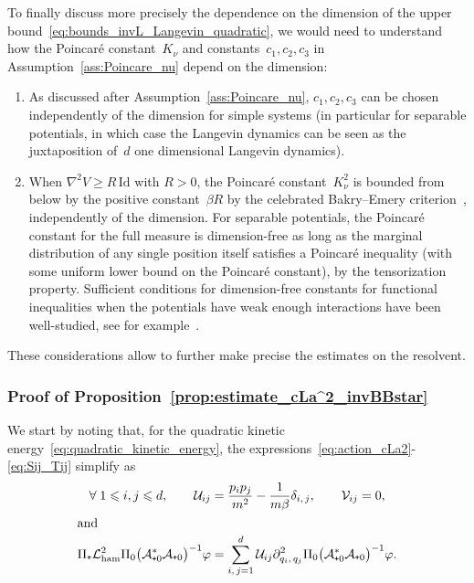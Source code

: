 \documentclass[AHL,Unicode,longabstracts,MathTools,published]{cedram}
\newcommand{\Id}{\mathrm{Id}}
\newcommand{\cLa}{\mathcal{A}}
\newcommand{\cLU}{\mathcal{U}}
\newcommand{\clV}{\mathcal{V}}
\newcommand{\cLham}{\mathcal{L}_{\rm ham}}
\newcommand{\subplus}{\textnormal{\texttt{+}}}
\renewcommand{\leq}{\leqslant}
\renewcommand{\geq}{\geqslant}
\newcommand*{\romanenumi}{\renewcommand*{\theenumi}{\roman{enumi}}}
\let\oldforall\forall
\renewcommand*{\forall}{\mathrel{\oldforall}}
\begin{document}
To finally discuss more precisely the dependence on the dimension of the upper bound~\eqref{eq:bounds_invL_Langevin_quadratic}, we would need to understand how the Poincaré constant~$K_\nu$ and constants~$c_1,c_2,c_3$ in Assumption~\ref{ass:Poincare_nu} depend on the dimension:
\begin{enumerate}\romanenumi
\item As discussed after Assumption~\ref{ass:Poincare_nu}, $c_1,c_2,c_3$ can be chosen independently of the dimension for simple systems (in particular for separable potentials, in which case the Langevin dynamics can be seen as the juxtaposition of~$d$ one dimensional Langevin dynamics).
\item When $\nabla^2 V \geq R \, \Id$ with $R > 0$, the Poincaré constant~$K_\nu^2$ is bounded from below by the positive constant~$\beta R$ by the celebrated Bakry--Emery criterion~\cite{BE85}, independently of the dimension. For separable potentials, the Poincaré constant for the full measure is dimension-free as long as the marginal distribution of any single position itself satisfies a Poincaré inequality (with some uniform lower bound on the Poincaré constant), by the tensorization property. Sufficient conditions for dimension-free constants for functional inequalities when the potentials have weak enough interactions have been well-studied, see for example~\cite{otto2007,yos2001}.
\end{enumerate}
These considerations allow to further make precise the estimates on the resolvent.

\subsubsection{Proof of Proposition~\ref{prop:estimate_cLa^2_invBBstar}}\label{sec:proof_prop:estimate_cLa^2_invBBstar}

We start by noting that, for the quadratic kinetic energy~\eqref{eq:quadratic_kinetic_energy}, the expressions~\eqref{eq:action_cLa2}-\eqref{eq:Sij_Tij} simplify as
\begin{align*}
\forall 1 \leq i,j \leq d, \qquad \cLU_{ij} &= \frac{p_{i}p_{j}}{m^2} - \frac{1}{m\beta}\delta_{i,\,j}, \qquad
\clV_{ij}= 0,
\\
\intertext{and}
\Pi_\subplus \cLham^2 \Pi_0 \big(\cLa_{\subplus 0}^*\cLa_{\subplus 0}\big)^{-1} \varphi &= \sum_{i,\,j=1}^d \cLU_{ij} \partial^2_{q_i,\,q_j} \Pi_0 \big(\cLa_{\subplus 0}^*\cLa_{\subplus 0}\big)^{-1}\varphi.
\end{align*}
\end{document}
